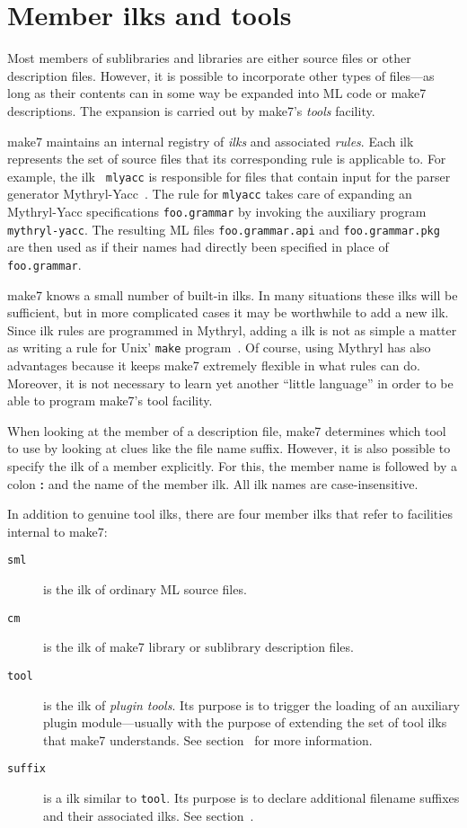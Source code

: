 
\section{Member ilks and tools}
\label{sec:ilks}

Most members of sublibraries and libraries are either source files or
other description files.  However, it is possible to incorporate other
types of files---as long as their contents can in some way be expanded
into ML code or make7 descriptions.  The expansion is carried out by make7's
{\it tools} facility.

make7 maintains an internal registry of {\em ilks} and associated {\em
rules}.  Each ilk represents the set of source files that its
corresponding rule is applicable to.  For example, the ilk {\tt
mlyacc} is responsible for files that contain input for the parser
generator Mythryl-Yacc~\cite{tarditi90:yacc}.  The rule for {\tt mlyacc}
takes care of expanding an Mythryl-Yacc specifications {\tt foo.grammar} by
invoking the auxiliary program {\tt mythryl-yacc}.  The resulting ML files
{\tt foo.grammar.api} and {\tt foo.grammar.pkg} are then used as if their
names had directly been specified in place of {\tt foo.grammar}.

make7 knows a small number of built-in ilks.  In many situations these
ilks will be sufficient, but in more complicated cases it may be
worthwhile to add a new ilk.  Since ilk rules are programmed in
Mythryl, adding a ilk is not as simple a matter as writing a rule for
{\sc Unix}' {\tt make} program~\cite{feldman79}.  Of course,
using Mythryl has also advantages because it keeps make7 extremely flexible in
what rules can do.  Moreover, it is not necessary to learn yet another
``little language'' in order to be able to program make7's tool facility.

When looking at the member of a description file, make7 determines which
tool to use by looking at clues like the file name suffix.  However,
it is also possible to specify the ilk of a member explicitly.  For
this, the member name is followed by a colon {\bf :} and the name of
the member ilk.  All ilk names are case-insensitive.

In addition to genuine tool ilks, there are four member ilks
that refer to facilities internal to make7:
\begin{description}
\item[{\tt sml}] is the ilk of ordinary ML source files.
\item[{\tt cm}] is the ilk of make7 library or sublibrary description files.
\item[{\tt tool}] is the ilk of {\em plugin tools}.  Its purpose is
to trigger the loading of an auxiliary plugin module---usually with the
purpose of extending the set of tool ilks that make7 understands.
See section~ for more information.
\item[{\tt suffix}] is a ilk similar to {\tt tool}.  Its purpose is
to declare additional filename suffixes and their associated ilks.
See section~.
\end{description}

